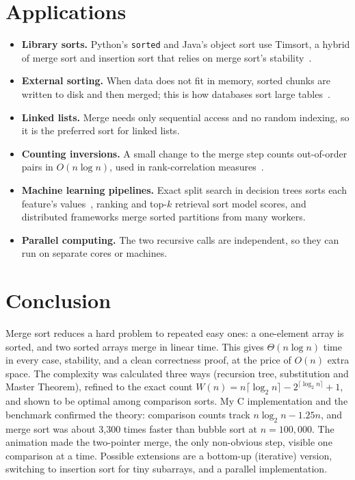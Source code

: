 \documentclass[11pt,a4paper]{article}
\theoremstyle{plain}
\theoremstyle{definition}
\renewcommand{\lg}{\log_2}
\begin{document}
\section{Applications}\label{sec:apps}
\begin{itemize}
  \item \textbf{Library sorts.} Python's \texttt{sorted} and Java's object sort use Timsort, a hybrid of merge sort and insertion sort that relies on merge sort's stability~\cite{peters}.
  \item \textbf{External sorting.} When data does not fit in memory, sorted chunks are written to disk and then merged; this is how databases sort large tables~\cite{knuth3}.
  \item \textbf{Linked lists.} Merge needs only sequential access and no random indexing, so it is the preferred sort for linked lists.
  \item \textbf{Counting inversions.} A small change to the merge step counts out-of-order pairs in $O(n\log n)$, used in rank-correlation measures~\cite{clrs}.
  \item \textbf{Machine learning pipelines.} Exact split search in decision trees sorts each feature's values~\cite{cart}, ranking and top-$k$ retrieval sort model scores, and distributed frameworks merge sorted partitions from many workers.
  \item \textbf{Parallel computing.} The two recursive calls are independent, so they can run on separate cores or machines.
\end{itemize}

\section{Conclusion}
Merge sort reduces a hard problem to repeated easy ones: a one-element array is sorted, and two sorted arrays merge in linear time. This gives $\Theta(n\log n)$ time in every case, stability, and a clean correctness proof, at the price of $O(n)$ extra space. The complexity was calculated three ways (recursion tree, substitution and Master Theorem), refined to the exact count $W(n)=n\lceil\lg n\rceil-2^{\lceil\lg n\rceil}+1$, and shown to be optimal among comparison sorts. My C implementation and the benchmark confirmed the theory: comparison counts track $n\lg n-1.25n$, and merge sort was about 3,300 times faster than bubble sort at $n=100{,}000$. The animation made the two-pointer merge, the only non-obvious step, visible one comparison at a time. Possible extensions are a bottom-up (iterative) version, switching to insertion sort for tiny subarrays, and a parallel implementation.
\end{document}
